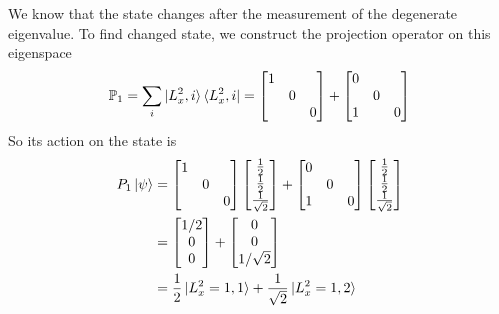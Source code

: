 \documentclass[../../../main.tex]{subfiles}
\begin{document}
We know that the state changes after the measurement of the degenerate eigenvalue.
To find changed state, we construct the projection operator on this eigenspace 
\begin{equation*}
    \mathbb{P }_1=\sum_i \ket{L_x^2,i}\bra{L_x^2,i} =
    \begin{bmatrix}
        1&&\\
        &0&\\
        &&0\\
    \end{bmatrix}
    +
        \begin{bmatrix}
        0&&\\
        &0&\\
        1&&0\\
    \end{bmatrix}
\end{equation*}
So its action on the state is 
\begin{align*}
    P_1 \ket{\psi} &=   \begin{bmatrix}
        1&&\\
        &0&\\
        &&0
    \end{bmatrix}
    \begin{bmatrix}
        \frac{1 }{2} \\ \frac{1 }{2} \\ \frac{1 }{\sqrt{2}}
    \end{bmatrix}
    +
        \begin{bmatrix}
        0&&\\
        &0&\\
        1&&0
    \end{bmatrix}
    \begin{bmatrix}
        \frac{1 }{2} \\ \frac{1 }{2} \\ \frac{1 }{\sqrt{2}}
    \end{bmatrix}\\
    &= 
    \begin{bmatrix}
        1/2\\0\\0
    \end{bmatrix}
    +
        \begin{bmatrix}
        0\\0\\1/\sqrt{2 }
    \end{bmatrix}\\
    &= \frac{1 }{2 }\ket{L_x^2=1,1}+\frac{1 }{\sqrt{2 }}\ket{L_x^2=1,2}
\end{align*}
\end{document}
